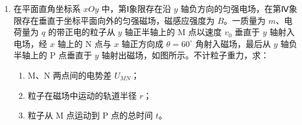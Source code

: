 \documentclass[\gkver]{gaokaozhenti}
\begin{document}
\begin{enumerate}
{（2）由电压表内阻、电流表内阻及待测电阻 $R_{0}$ 的阻值可判断测量电路要用伏安法的内接法；变阻器的电阻比较小，所以供电电路采用分压法，实物连接如图所示。


（3）设 A、B 两点的摆线长分别为 $L_{A}$ 和 $L_{B}$，摆线到重心的距离为 $L'$，则 A、B 两处的摆长分别为 $L_{A}+L'$ 和 $L_{B}+L'$。根据周期公式 $T=2\pi\sqrt{\frac{l}{g}}$ 得 $l=\frac{gT^{2}}{4\pi^{2}}$，则 $L_{A}+L'=\frac{gT_{A}^{2}}{4\pi^{2}}$，$L_{B}+L'=\frac{gT_{B}^{2}}{4\pi^{2}}$；两式相减得 $L_{B}-L_{A}=\frac{g(T_{B}^{2}-T_{A}^{2})}{4\pi^{2}}$，所以 $g=\frac{4\pi^{2}(L_{A}-L_{B})}{T_{A}^{2}-T_{B}^{2}}$。从该式可以看出，最终结果与重心的位置无关，所以测量值不受影响，与摆球重心就在球心时相同。
}

\item
在平面直角坐标系 $xOy$ 中，第Ⅰ象限存在沿 $y$ 轴负方向的匀强电场，在第Ⅳ象限存在垂直于坐标平面向外的匀强磁场，磁感应强度为 $B$。一质量为 $m$、电荷量为 $q$ 的带正电的粒子从 $y$ 轴正半轴上的 M 点以速度 $v_{0}$ 垂直于 $y$ 轴射入电场，经 $x$ 轴上的 N 点与 $x$ 轴正方向成 $\theta=60^{\circ}$ 角射入磁场，最后从 $y$ 轴负半轴上的 P 点垂直于 $y$ 轴射出磁场，如图所示。不计粒子重力，求：

\begin{enumerate}
	\item
	M、N 两点间的电势差 $U_{MN}$；
	\item
	粒子在磁场中运动的轨道半径 $r$；
	\item
	粒子从 M 点运动到 P 点的总时间 $t$。
\end{enumerate}



\end{enumerate}
\end{document}
